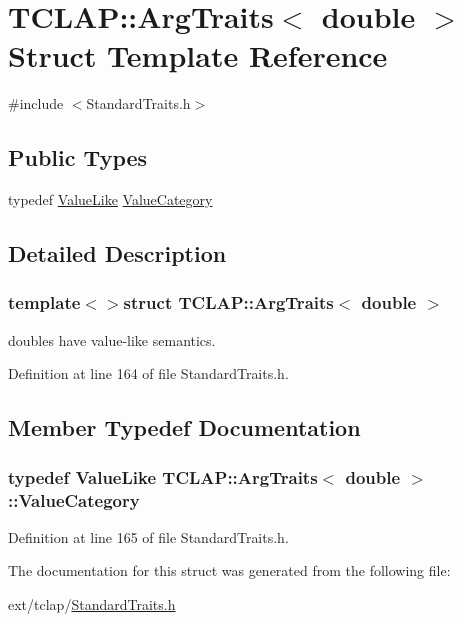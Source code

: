 \hypertarget{struct_t_c_l_a_p_1_1_arg_traits_3_01double_01_4}{}\section{T\+C\+L\+A\+P\+:\+:Arg\+Traits$<$ double $>$ Struct Template Reference}
\label{struct_t_c_l_a_p_1_1_arg_traits_3_01double_01_4}


{\ttfamily \#include $<$Standard\+Traits.\+h$>$}

\subsection*{Public Types}
\begin{DoxyCompactItemize}
\item 
typedef \hyperlink{struct_t_c_l_a_p_1_1_value_like}{Value\+Like} \hyperlink{struct_t_c_l_a_p_1_1_arg_traits_3_01double_01_4_a06ac5f8ebfcbc537e9ce57b96836dd3d}{Value\+Category}
\end{DoxyCompactItemize}


\subsection{Detailed Description}
\subsubsection*{template$<$$>$struct T\+C\+L\+A\+P\+::\+Arg\+Traits$<$ double $>$}

doubles have value-\/like semantics. 

Definition at line 164 of file Standard\+Traits.\+h.



\subsection{Member Typedef Documentation}
\hypertarget{struct_t_c_l_a_p_1_1_arg_traits_3_01double_01_4_a06ac5f8ebfcbc537e9ce57b96836dd3d}{}
\subsubsection[{Value\+Category}]{\setlength{\rightskip}{0pt plus 5cm}typedef {\bf Value\+Like} {\bf T\+C\+L\+A\+P\+::\+Arg\+Traits}$<$ double $>$\+::{\bf Value\+Category}}\label{struct_t_c_l_a_p_1_1_arg_traits_3_01double_01_4_a06ac5f8ebfcbc537e9ce57b96836dd3d}


Definition at line 165 of file Standard\+Traits.\+h.



The documentation for this struct was generated from the following file\+:\begin{DoxyCompactItemize}
\item 
ext/tclap/\hyperlink{_standard_traits_8h}{Standard\+Traits.\+h}\end{DoxyCompactItemize}

